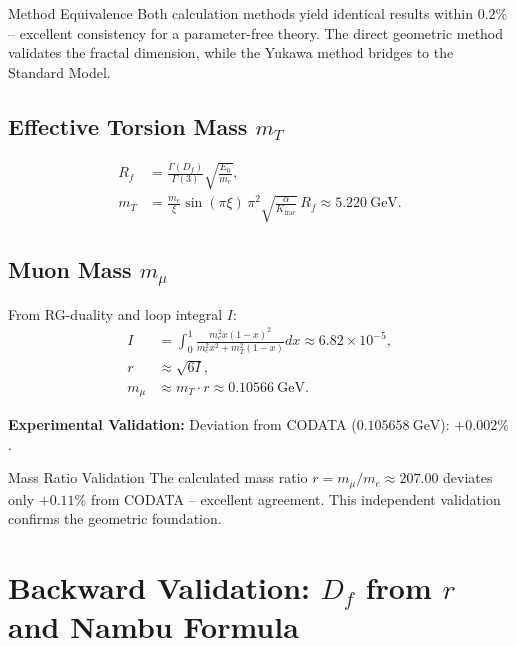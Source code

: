 	\begin{result}{Method Equivalence}{}
		Both calculation methods yield identical results within $0.2\%$ -- excellent consistency for a parameter-free theory. The direct geometric method validates the fractal dimension, while the Yukawa method bridges to the Standard Model.
	\end{result}
	
	\subsection{Effective Torsion Mass $m_T$}
	\label{subsec:torsion_mass}
	
	\begin{align}
		R_f &= \frac{\Gamma(D_f)}{\Gamma(3)} \sqrt{\frac{E_0}{m_e}}, \label{eq:Rf} \\
		m_T &= \frac{m_e}{\xi} \sin(\pi \xi) \, \pi^2 \sqrt{\frac{\alpha}{K_{\text{frac}}}} \, R_f \approx \SI{5.220}{\giga\electronvolt}. \label{eq:mT}
	\end{align}
	
	\subsection{Muon Mass $m_{\mu}$}
	\label{subsec:muon_mass}
	
	From RG-duality and loop integral $I$:
	\begin{align}
		I &= \int_0^1 \frac{m_e^2 x (1-x)^2}{m_e^2 x^2 + m_T^2 (1-x)}  dx \approx 6.82 \times 10^{-5}, \label{eq:I} \\
		r &\approx \sqrt{6 I}, \label{eq:r} \\
		m_{\mu} &\approx m_T \cdot r \approx \SI{0.10566}{\giga\electronvolt}. \label{eq:mmu}
	\end{align}
	
	\textbf{Experimental Validation:} Deviation from CODATA ($\SI{0.105658}{\giga\electronvolt}$): $+0.002\%$.
	
	\begin{important}{Mass Ratio Validation}{}
		The calculated mass ratio $r = m_{\mu} / m_e \approx 207.00$ deviates only $+0.11\%$ from CODATA -- excellent agreement. This independent validation confirms the geometric foundation.
	\end{important}
	
	\section{Backward Validation: $D_f$ from $r$ and Nambu Formula}
	\label{sec:backward_validation}
	
